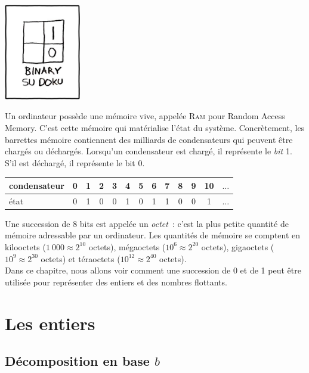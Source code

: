 \documentclass{magnolia}
\begin{document}
\hfill\includegraphics[width=0.25\textwidth]{../../Commun/Images/python-cours-sudoku.jpg}
\magtoc


\vspace{2ex}
Un ordinateur possède une mémoire vive, appelée \textsc{Ram} pour \og Random Access
Memory\fg. C'est cette mémoire qui matérialise l'état du système. Concrètement, les
barrettes mémoire contiennent des milliards de condensateurs qui peuvent être
chargés ou déchargés. Lorsqu'un condensateur est chargé, il représente le \emph{bit} 1. S'il est déchargé,
il représente le bit 0.

\begin{center}
\begin{tabular}{|l||c|c|c|c|c|c|c|c|c|c|c|c|}
\hline
condensateur & 0 & 1 & 2 & 3 & 4 & 5 & 6 & 7 & 8 & 9 & 10 & $\ldots$ \\
\hline
état & 0 & 1 & 0 & 0 & 1 & 0 & 1 & 1 & 0 & 0 & 1 & $\ldots$ \\
\hline
\end{tabular}
\end{center}
\noindent
Une succession de 8 bits est appelée un \emph{octet}~: c'est la plus petite quantité
de mémoire adressable par un ordinateur. Les quantités de mémoire se comptent
en kilooctets ($1\ 000\approx 2^{10}$ octets), mégaoctets ($10^6\approx 2^{20}$ octets),
gigaoctets ($10^9\approx 2^{30}$ octets) et téraoctets ($10^{12}\approx 2^{40}$ octets).\\

Dans ce chapitre, nous allons voir comment une succession de 0 et de 1 peut être
utilisée pour représenter des entiers et des nombres flottants.

\section{Les entiers}

\subsection{Décomposition en base $b$}
\end{document}
